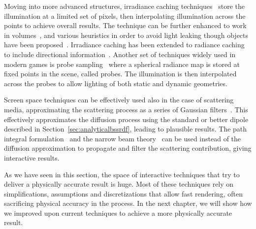Moving into more advanced structures, irradiance caching techniques~\cite{Ward1988, Tole2002} store the illumination at a limited set of pixels, then interpolating illumination across the points to achieve overall results. The technique can be further enhanced to work in volumes~\cite{Greger1998}, and various heuristics in order to avoid light leaking though objects have been proposed~\cite{Gautron2009}. Irradiance caching has been extended to radiance caching to include directional information~\cite{Krivanek2008,Scherzer2012}. Another set of techniques widely used in modern games is probe sampling~\cite{Levoy1996,Hooker2016, McGuire2017,Silvennoinen2017} where a spherical radiance map is stored at fixed points in the scene, called probes. The illumination is then interpolated across the probes to allow lighting of both static and dynamic geometries. 

Screen space techniques can be effectively used also in the case of scattering media, approximating the scattering process as a series of Gaussian filters~\cite{dEon2011, Jimenez2015}. This effectively approximates the diffusion process using the standard or better dipole described in Section~\ref{sec:analyticalbssrdf}, leading to plausible results. The path integral formulation~\cite{Premoze2003, Hegeman2005} and the narrow beam theory~\cite{Shinya2016} can be used instead of the diffusion approximation to propagate and filter the scattering contribution, giving interactive results.

As we have seen in this section, the space of interactive techniques that try to deliver a physically accurate result is huge. Most of these techniques rely on simplifications, assumptions and discretizations that allow fast rendering, often sacrificing physical accuracy in the process. In the next chapter, we will show how we improved upon current techniques to achieve a more physically accurate result.
